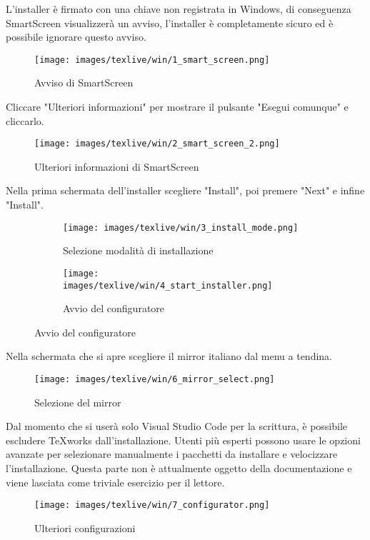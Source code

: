 \documentclass[envcountsame,envcountchap]{svmono}
\begin{document}
L'installer è firmato con una chiave non registrata in Windows, di conseguenza SmartScreen visualizzerà un avviso,
l'installer è completamente sicuro ed è possibile ignorare questo avviso.
\begin{figure}[H]
    \centering
    \texttt{[image: images/texlive/win/1\_smart\_screen.png]}
    \caption{Avviso di SmartScreen}
    \label{avviso_smart_screen}
\end{figure}
Cliccare "Ulteriori informazioni" per mostrare il pulsante "Esegui comunque" e cliccarlo.
\begin{figure}[H]
    \centering
    \texttt{[image: images/texlive/win/2\_smart\_screen\_2.png]}
    \caption{Ulteriori informazioni di SmartScreen}
    \label{info_smart_screen}
\end{figure}
Nella prima schermata dell'installer scegliere "Install", poi premere "Next" e infine "Install".
\begin{figure}[H]
    \begin{subfigure}{0.49\textwidth}
        \centering
        \texttt{[image: images/texlive/win/3\_install\_mode.png]}
        \caption{Selezione modalità di installazione}
        \label{texlive_install_mode}
    \end{subfigure}
    \begin{subfigure}{0.49\textwidth}
        \centering
        \texttt{[image: images/texlive/win/4\_start\_installer.png]}
        \caption{Avvio del configuratore}
        \label{texlive_config}
    \end{subfigure}
\end{figure}
Nella schermata che si apre scegliere il mirror italiano dal menu a tendina.
\begin{figure}[H]
    \centering
    \texttt{[image: images/texlive/win/6\_mirror\_select.png]}
    \caption{Selezione del mirror}
    \label{texlive_mirror}
\end{figure}
Dal momento che si userà solo Visual Studio Code per la scrittura, è possibile escludere TeXworks dall'installazione.
Utenti più esperti possono usare le opzioni avanzate per selezionare manualmente i pacchetti da installare
e velocizzare l'installazione. Questa parte non è attualmente oggetto della documentazione e viene lasciata
come triviale esercizio per il lettore.
\begin{figure}[H]
    \centering
    \texttt{[image: images/texlive/win/7\_configurator.png]}
    \caption{Ulteriori configurazioni}
    \label{texlive_config_2}
\end{figure}
\end{document}
